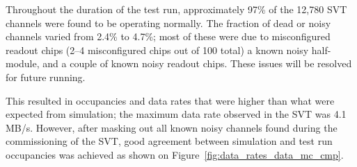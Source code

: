 Throughout the duration of the test run, approximately 97\% of the 12,780 SVT 
channels were found to be operating normally. 
The fraction of dead or noisy channels varied from 2.4\% to 4.7\%; 
most of these were due to misconfigured readout chips (2--4 misconfigured chips out of 100 total) 
a known noisy half-module, and a couple of known noisy readout chips. 
These issues will be resolved for future running.

This resulted in occupancies and data rates that were higher than what were expected from simulation; 
the maximum data rate observed in the SVT was 4.1 MB/s.
However, after masking out all known noisy channels found during the commissioning of the SVT, good agreement 
between simulation and test run occupancies was achieved as shown on Figure~\ref{fig:data_rates_data_mc_cmp}.

